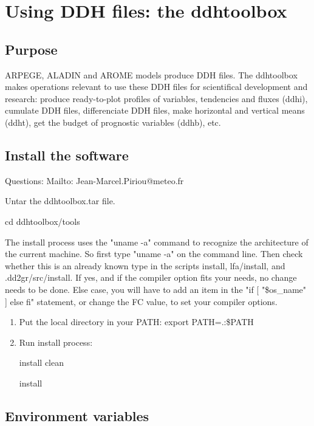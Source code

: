 \chapter{Using DDH files: the ddhtoolbox}

\section{Purpose}

\p ARPEGE, ALADIN and AROME models produce DDH files. The ddhtoolbox makes operations relevant to use these DDH files for scientifical development and research: produce ready-to-plot profiles of variables, tendencies and fluxes (ddhi), cumulate DDH files, differenciate DDH files, make horizontal and vertical means (ddht), get the budget of prognostic variables (ddhb), etc.

\section{Install the software}

\p Questions: Mailto: Jean-Marcel.Piriou@meteo.fr

\p Untar the ddhtoolbox.tar file.

\p cd ddhtoolbox/tools

\p The install process uses the "uname -a" command to recognize the architecture of the  current  machine.  So first type "uname -a" on the command line. Then check whether  this  is an already known type in the scripts install, lfa/install, and .dd2gr/src/install.  If  yes, and if the compiler option fits your needs, no change needs to be done.  Else  case,  you  will  have  to  add an item in the "if [ "\$os\_name" ] else fi" statement, or change the FC value, to set your compiler options.

\begin{enumerate}
  \item Put the local directory in your PATH:
    export PATH=.:\$PATH
  \item Run install process: 

    install clean

    install
\end{enumerate}

\section{Environment variables}

